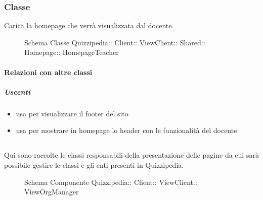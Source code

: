 \subsubsection{Classe }
Carica la homepage che verrà visualizzata dal docente.
\begin{figure}[H]
\centering
\noindent{}
\caption[Schema Classe HomepageTeacher]{Schema Classe Quizzipedia:: Client:: ViewClient:: Shared:: Homepage:: HomepageTeacher}
\end{figure}
\paragraph{Relazioni con altre classi}
\subparagraph{Uscenti}
\begin{itemize}
\item usa  per visualizzare il footer del sito
\item usa  per mostrare in homepage lo header con le funzionalità del docente
\end{itemize}
\subsection{}
Qui sono raccolte le classi responsabili della presentazione delle pagine da cui sarà possibile gestire le classi e gli enti presenti in Quizzipedia.
\begin{figure}[H]
\centering
\noindent{}
\caption[Schema Componente ViewOrgManager]{Schema Componente Quizzipedia:: Client:: ViewClient:: ViewOrgManager}
\end{figure}
